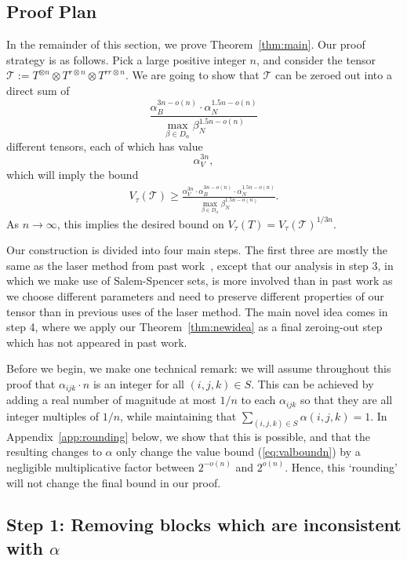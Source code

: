 \documentclass{theoretics}
\newcommand{\T}{\mathcal{T}}
\begin{document}
\subsection{Proof Plan}
In the remainder of this section, we prove Theorem~\ref{thm:main}. Our proof strategy is as follows. Pick a large positive integer $n$, 
and consider the tensor $\T := T^{\otimes n} \otimes T^{r \otimes n} \otimes T^{rr \otimes n}$. We are going to show that $\T$ can be zeroed out into a direct sum of $$\frac{\alpha_B^{3n - o(n)} \cdot \alpha_N^{1.5n - o(n)}}{\max_{\beta \in D_\alpha} \beta_N^{1.5 n - o(n)}}$$ different tensors, each of which has value $$\alpha_V^{3n},$$ which will imply the bound \begin{align}\label{eq:valboundn}V_\tau(\T) \geq \frac{\alpha_V^{3n} \cdot \alpha_B^{3n - o(n)} \cdot \alpha_N^{1.5n - o(n)}}{\max_{\beta \in D_\alpha} \beta_N^{1.5 n - o(n)}}.\end{align} As $n \to \infty$, this implies the desired bound on $V_\tau(T) = V_\tau(\T)^{1/3n}$.

Our construction is divided into four main steps. The first three are mostly the same as the laser method from past work~\cite{coppersmith,stothers,v12,legall}, except that our analysis in step 3, in which we make use of Salem-Spencer sets, is more involved than in past work as we choose different parameters and need to preserve different properties of our tensor than in previous uses of the laser method. The main novel idea comes in step 4, where we apply our Theorem~\ref{thm:newidea} as a final zeroing-out step which has not appeared in past work.

Before we begin, we make one technical remark: we will assume throughout this proof that $\alpha_{ijk} \cdot n$ is an integer for all $(i,j,k) \in S$. This can be achieved by adding a real number of magnitude at most $1/n$ to each $\alpha_{ijk}$ so that they are all integer multiples of $1/n$, while maintaining that $\sum_{(i,j,k) \in S} \alpha(i,j,k) = 1$. In Appendix~\ref{app:rounding} below, we show that this is possible, and that the resulting changes to $\alpha$ only change the value bound (\ref{eq:valboundn}) by a negligible multiplicative factor between $2^{-o(n)}$ and $2^{o(n)}$. Hence, this `rounding' will not change the final bound in our proof.

\subsection{Step 1: Removing blocks which are inconsistent with \texorpdfstring{$\alpha$}{alpha}}
\end{document}
